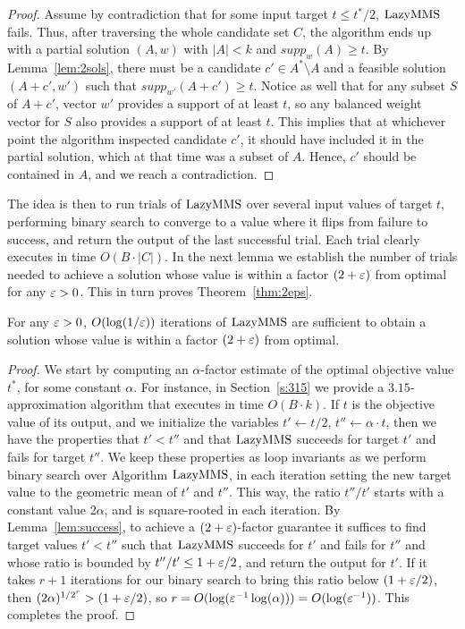 \begin{proof}
Assume by contradiction that for some input target $t\leq t^*/2$, $\operatorname{LazyMMS}$ fails. Thus, after traversing the whole candidate set $C$, the algorithm ends up with a partial solution $(A,w)$ with $|A|<k$ and $supp_w(A)\geq t$. By Lemma~\ref{lem:2sols}, there must be a candidate $c'\in A^*\setminus A$ and a feasible solution $(A+c', w')$ such that $supp_{w'}(A+c')\geq t$. Notice as well that for any subset $S$ of $A+c'$, vector $w'$ provides a support of at least $t$, so any balanced weight vector for $S$ also provides a support of at least $t$. This implies that at whichever point the algorithm inspected candidate $c'$, it should have included it in the partial solution, which at that time was a subset of $A$. Hence, $c'$ should be contained in $A$, and we reach a contradiction.
\end{proof}

The idea is then to run trials of $\operatorname{LazyMMS}$ over several input values of target $t$, performing binary search to converge to a value where it flips from failure to success, and return the output of the last successful trial. Each trial clearly executes in time $O(B\cdot |C|)$. 
In the next lemma we establish the number of trials needed to achieve a solution whose value is within a factor $(2+\varepsilon)$ from optimal for any $\varepsilon>0$. This in turn proves Theorem~\ref{thm:2eps}.

\begin{lemma}\label{lem:lazybinary}
For any $\varepsilon>0$, $O(\log(1/\varepsilon))$ iterations of $\operatorname{LazyMMS}$ are sufficient to obtain a solution whose value is within a factor $(2+\varepsilon)$ from optimal.
\end{lemma}

\begin{proof}
We start by computing an $\alpha$-factor estimate of the optimal objective value $t^*$, for some constant $\alpha$. For instance, in Section~\ref{s:315} we provide a $3.15$-approximation algorithm that executes in time $O(B\cdot k)$. If $t$ is the objective value of its output, and we initialize the variables $t'\leftarrow t/2$, $t''\leftarrow \alpha\cdot t$, then we have the properties that $t'<t''$ and that $\operatorname{LazyMMS}$ succeeds for target $t'$ and fails for target $t''$. We keep these properties as loop invariants as we perform binary search over Algorithm $\operatorname{LazyMMS}$, in each iteration setting the new target value to the geometric mean of $t'$ and $t''$. This way, the ratio $t''/t'$ starts with a constant value $2 \alpha$, and is square-rooted in each iteration. 
By Lemma~\ref{lem:success}, to achieve a $(2+\varepsilon)$-factor guarantee it suffices to find target values $t'<t''$ such that $\operatorname{LazyMMS}$ succeeds for $t'$ and fails for $t''$ and whose ratio is bounded by $t''/t'\leq 1+\varepsilon/2$, and return the output for $t'$. If it takes $r+1$ iterations for our binary search to bring this ratio below $(1+\varepsilon/2)$, then $(2\alpha)^{1/2^r} > (1+\varepsilon/2)$, so $r= O(\log (\varepsilon^{-1} \log(\alpha))) = O(\log(\varepsilon^{-1}))$. This completes the proof. 
\end{proof}